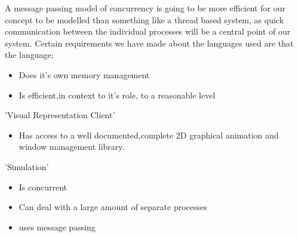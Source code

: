 A message passing model of concurrency is going to be more efficient for our concept to be modelled than something like a thread based system, as quick communication between the individual processes will be a central point of our system.
Certain requirements we have made about the languages used are that the language;
\begin{itemize}
\item Does it's own memory management
\item Is efficient,in context to it's role, to a reasonable level 
\end{itemize}
'Visual Representation Client'
\begin{itemize}
\item Has access to a well documented,complete 2D graphical animation and window management library.
\end{itemize}
'Simulation'
\begin{itemize}
\item Is concurrent
\item Can deal with a large amount of separate processes
\item uses message passing
\end{itemize}
\clearpage
\endinput
